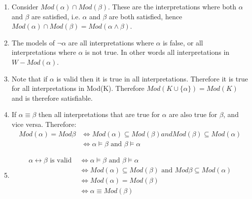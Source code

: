 \begin{enumerate}
    \item Consider $Mod(\alpha) \cap Mod(\beta)$. These are the interpretations where both $\alpha$ and $\beta$ are satisfied, i.e. $\alpha$ and $\beta$ are both satisfied, hence $ Mod(\alpha) \cap Mod(\beta) = Mod(\alpha \wedge \beta)$.

    \item The models of $\neg \alpha$ are all interpretations where $\alpha$ is false, or all interpretations where $\alpha$ is not true. In other words all interpretations in $W - Mod(\alpha)$.

    \item Note that if $\alpha$ is valid then it is true in all interpretations. Therefore it is true for all interpretations in Mod(K). Therefore $Mod(K \cup \{\alpha\}) = Mod(K)$ and is therefore satisfiable.

    \item If $\alpha \equiv \beta$ then all interpretations that are true for $\alpha$ are also true for $\beta$, and vice versa. Therefore:
    \begin{align*}
        Mod(\alpha) = Mod{\beta} &\Leftrightarrow Mod(\alpha) \subseteq Mod(\beta) and Mod(\beta) \subseteq Mod(\alpha)\\
        &\Leftrightarrow \alpha \models \beta \text{ and } \beta \models \alpha
    \end{align*}

    \item 
    \begin{align*}
        \alpha \leftrightarrow \beta \text{ is valid } &\Leftrightarrow \alpha \models \beta \text{ and } \beta \models \alpha\\
        &\Leftrightarrow Mod(\alpha) \subseteq Mod(\beta) \text{ and } Mod{\beta} \subseteq Mod(\alpha)\\
        &\Leftrightarrow Mod(\alpha) = Mod(\beta)\\
        &\Leftrightarrow \alpha \equiv Mod(\beta)
    \end{align*}
\end{enumerate}